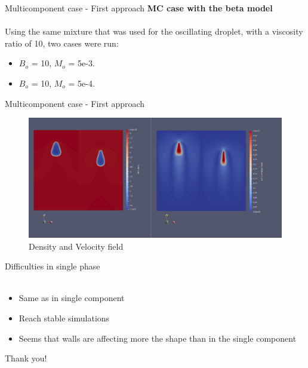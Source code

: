 \documentclass[8pt]{beamer}
\begin{document}
	\begin{frame}{Multicomponent case - First approach}
		\textbf{MC case with the beta model}\\~\\
		Using the same mixture that was used for the oscillating droplet, with a viscosity ratio of 10, two cases were run:
		\begin{itemize}
			\item $B_o$ = 10, $M_o$ = 5e-3.
			\item $B_o$ = 10, $M_o$ = 5e-4.
		\end{itemize}
	\end{frame}
	\begin{frame}{Multicomponent case - First approach}
		\begin{figure}
			\centering
			\includegraphics[scale=0.15]{pics/risingMCComp.png}
			\\{\tiny \justifying Density and Velocity field}
		\end{figure}
	\end{frame}
	
	\begin{frame}{Difficulties in single phase}
		\textbf{}\\~\\
		\begin{itemize}
			\item Same as in single component
			\item Reach stable simulations
			\item Seems that walls are affecting more the shape than in the single component
		\end{itemize}
	\end{frame}
	
	\begin{frame}{}
		\centering
		Thank you!
	\end{frame}

	\begin{frame}{}
	
	\end{frame}
	
\end{document}
